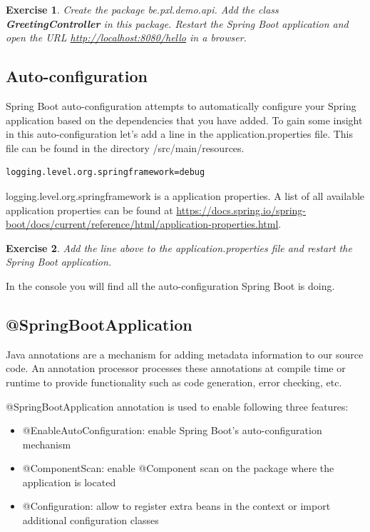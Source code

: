 \documentclass[a4paper, 12pt]{report}
\newenvironment{boxexercise}
{\begin{tcolorbox}
[enhanced jigsaw,breakable,pad at break*=1mm,
 colback=tsyellow!20,boxrule=0pt,frame hidden]}
{\end{tcolorbox}}
\newtheorem{envoefening}{\textbf{Exercise}}[chapter]
\newenvironment{oefening}
               {\begin{boxexercise}\begin{envoefening}}
               {\end{envoefening}\end{boxexercise}}
\begin{document}
\begin{oefening}
Create the package \textit{be.pxl.demo.api}. Add the class \textbf{GreetingController} in this package. Restart the Spring Boot application and open the URL \url{http://localhost:8080/hello} in a browser.
\end{oefening}

\subsection{Auto-configuration}

Spring Boot auto-configuration attempts to automatically configure your Spring application based on the dependencies that you have added.
To gain some insight in this auto-configuration let's add a line in the application.properties file. This file can be found in the directory /src/main/resources. 

\begin{lstlisting}
logging.level.org.springframework=debug
\end{lstlisting}

logging.level.org.springframework is a application properties. A list of all available application properties can be found at \url{https://docs.spring.io/spring-boot/docs/current/reference/html/application-properties.html}.

\begin{oefening}
Add the line above to the application.properties file and restart the Spring Boot application.
\end{oefening}

In the console you will find all the auto-configuration Spring Boot is doing.

\subsection{@SpringBootApplication}

Java annotations are a mechanism for adding metadata information to our source code. An annotation processor processes these annotations at compile time or runtime to provide functionality such as code generation, error checking, etc.

@SpringBootApplication annotation is used to enable following three features:
\begin{itemize}
\item @EnableAutoConfiguration: enable Spring Boot’s auto-configuration mechanism
\item @ComponentScan: enable @Component scan on the package where the application is located
\item @Configuration: allow to register extra beans in the context or import additional configuration classes
\end{itemize}
\end{document}
